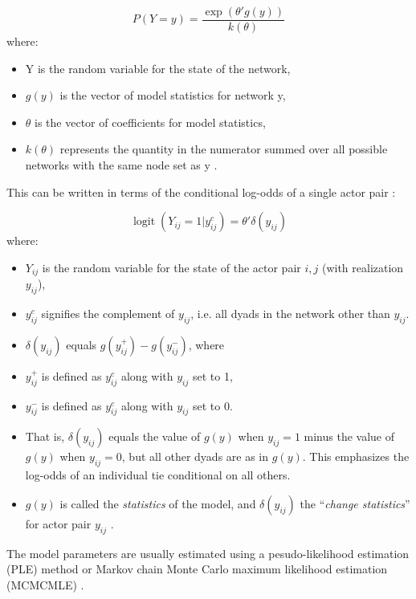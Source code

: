 \documentclass{acm_proc_article-sp}
\begin{document}
\begin{equation} P(Y=y)=\frac{\exp(\theta'g(y))}{k(\theta)} \end{equation}
where:
\begin{itemize}
\item Y is the random variable for the state of the network,
\item \( g(y) \) is the vector of model statistics for network y,
\item \( \theta \) is the vector of coefficients for model statistics, 
\item \( k(\theta) \) represents the quantity in the numerator summed over all possible networks with the same node set as y \cite{Krivitsky}.
\end{itemize}
This can be written in terms of the conditional log-odds of a single actor pair \cite{Krivitsky}:

\begin{equation} \operatorname{logit}{(Y_{ij}=1|y^{c}_{ij})=\theta'\delta(y_{ij})} \end{equation}
where: 
\begin{itemize}
\item \( Y_{ij} \) is the random variable for the state of the actor pair \( i,j \) (with realization \( y_{ij} \)), 
\item \( y^{c}_{ij} \) signifies the complement of \( y_{ij} \), i.e. all dyads in the network other than \( y_{ij} \). 
\item \( \delta(y_{ij}) \) equals \( g(y^{+}_{ij})-g(y^{-}_{ij}) \), where 
\item \( y^{+}_{ij} \) is defined as \( y^{c}_{ij} \) along with \( y_{ij} \) set to 1,
\item \( y^{-}_{ij} \) is defined as \( y^{c}_{ij} \) along with \( y_{ij} \) set to 0.
\item That is, \( \delta(y_{ij}) \) equals the value of \( g(y) \) when \( y_{ij}=1 \) minus the value of \( g(y) \) when \( y_{ij}=0 \), but all other dyads are as in \( g(y) \). This emphasizes the log-odds of an individual tie conditional on all others. 
\item \( g(y) \) is called the \textit{statistics} of the model, and \(\delta(y_{ij}) \) the ``\textit{change statistics}'' for actor pair \( y_{ij} \) \cite{Krivitsky}.
\end{itemize}

The model parameters are usually estimated using a pesudo-likelihood estimation (PLE) method or Markov chain Monte Carlo maximum likelihood estimation (MCMCMLE) \cite{SnijdersMCMCMLE}. 
\end{document}
